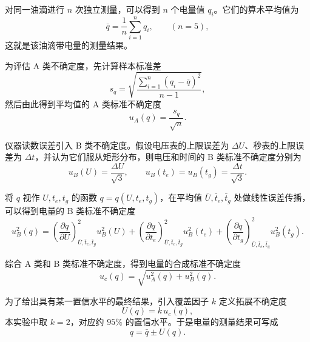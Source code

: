 \documentclass[a4paper,8pt,twocolumn]{article}
\begin{document}
对同一油滴进行 $n$ 次独立测量，可以得到 $n$ 个电量值 $q_i$。它们的算术平均值为
\begin{equation}
  \bar q = \frac{1}{n}\sum_{i=1}^n q_i,\qquad (n=5),
\end{equation}
这就是该油滴带电量的测量结果。

为评估 A 类不确定度，先计算样本标准差
\begin{equation}
  s_q = \sqrt{\frac{\sum_{i=1}^n (q_i-\bar q)^2}{n-1}},
\end{equation}
然后由此得到平均值的 A 类标准不确定度
\begin{equation}
  u_A(q) = \frac{s_q}{\sqrt{n}}.
\end{equation}

仪器读数误差引入 B 类不确定度。假设电压表的上限误差为 $\Delta U$、秒表的上限误差为 $\Delta t$，并认为它们服从矩形分布，则电压和时间的 B 类标准不确定度分别为
\begin{equation}
  u_B(U) = \frac{\Delta U}{\sqrt{3}},\qquad
  u_B(t_e) = u_B(t_g) = \frac{\Delta t}{\sqrt{3}}.
\end{equation}

将 $q$ 视作 $U,t_e,t_g$ 的函数 $q=q(U,t_e,t_g)$，在平均值 $\bar U,\bar t_e,\bar t_g$ 处做线性误差传播，可以得到电量的 B 类标准不确定度
\begin{equation}
  u_B^2(q)
  = \left(\frac{\partial q}{\partial U}\right)^2_{\bar U,\bar t_e,\bar t_g} u_B^2(U)
   + \left(\frac{\partial q}{\partial t_e}\right)^2_{\bar U,\bar t_e,\bar t_g} u_B^2(t_e)
   + \left(\frac{\partial q}{\partial t_g}\right)^2_{\bar U,\bar t_e,\bar t_g} u_B^2(t_g).
\end{equation}

综合 A 类和 B 类标准不确定度，得到电量的合成标准不确定度
\begin{equation}
  u_c(q) = \sqrt{u_A^2(q) + u_B^2(q)}.
\end{equation}

为了给出具有某一置信水平的最终结果，引入覆盖因子 $k$ 定义拓展不确定度
\begin{equation}
  U(q) = k\,u_c(q),
\end{equation}
本实验中取 $k=2$，对应约 $95\%$ 的置信水平。于是电量的测量结果可写成
\begin{equation}
  q = \bar q \pm U(q).
\end{equation}

\end{document}
